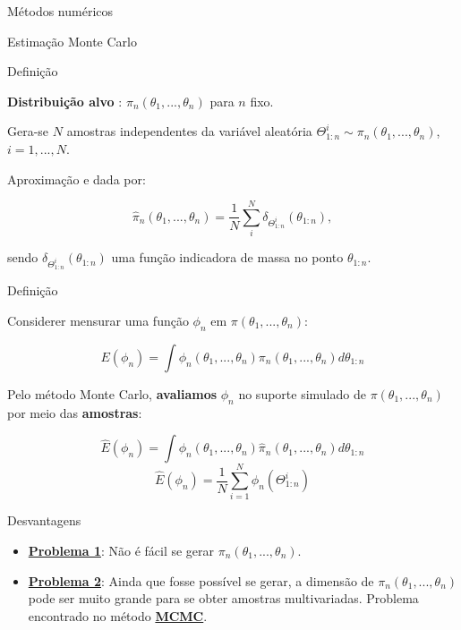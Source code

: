 \documentclass{beamer}
\begin{document}
\begin{frame}{Métodos numéricos}

    \begin{block}{Estimação}
      \Huge  Monte Carlo
    \end{block}


\end{frame}

\begin{frame}{Definição}

\textbf{Distribuição alvo} : $\pi_n(\theta_1,...,\theta_n)$ para $n$ fixo.

\pause
\vspace{0.5cm}

Gera-se $N$ amostras independentes da variável aleatória $\Theta^i_{1:n} \sim \pi_n(\theta_1,...,\theta_n)$, $i=1,...,N$.

\pause
\vspace{0.5cm}

Aproximação e dada por:

$$
\hat{\pi}_n(\theta_1,...,\theta_n) = \frac{1}{N}\sum_i^N \delta_{\Theta^i_{1:n}}(\theta_{1:n}),
$$

\vspace{0.5cm}
sendo $\delta_{\Theta_{1:n}^{i}}(\theta_{1:n})$ uma função indicadora de massa no ponto $\theta_{1:n}$.
\end{frame}





\begin{frame}{Definição}

Considerer mensurar uma função $\phi_n$ em $\pi(\theta_1,...,\theta_n)$:

$$
E(\phi_n) =  \int \phi_n(\theta_1,...,\theta_n)\pi_n(\theta_1,...,\theta_n)d\theta_{1:n}
$$
\pause

Pelo método Monte Carlo, \textbf{avaliamos}  $\phi_n$ no suporte simulado de $\pi(\theta_1,...,\theta_n)$ por meio das \textbf{amostras}:

$$
\hat{E}(\phi_n) = \int \phi_n(\theta_1,...,\theta_n)\hat{\pi}_n(\theta_1,...,\theta_n)d\theta_{1:n}
$$
\pause
$$
\hat{E}(\phi_n) = \frac{1}{N} \sum_{i=1}^N \phi_n(\Theta^i_{1:n})
$$


\end{frame}

\begin{frame}{Desvantagens}


\begin{itemize}

\item[] \underline{\textbf{Problema 1}}: Não é fácil se gerar $\pi_n(\theta_1,...,\theta_n)$.
\pause 
\item[] \underline{\textbf{Problema 2}}: Ainda que fosse possível se gerar, a dimensão de $\pi_n(\theta_1,...,\theta_n)$ pode ser muito grande para se obter amostras multivariadas. Problema encontrado no método \underline{\textbf{MCMC}}.

\end{itemize}
\end{frame}
\end{document}
